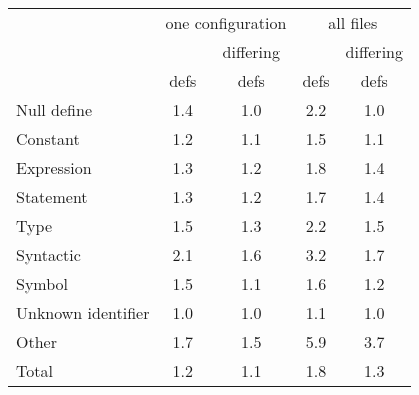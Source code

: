 \begin{tabular}{|l|c|c|c|c|} \hline
 & \multicolumn{2}{c|}{one configuration}
 & \multicolumn{2}{c|}{all files} \\ \cline{2-5}
 & & \multicolumn{1}{c|}{differing} & & \multicolumn{1}{c|}{differing} \\
 & \multicolumn{1}{c|}{defs} & \multicolumn{1}{c|}{defs}
 & \multicolumn{1}{c|}{defs} & \multicolumn{1}{c|}{defs} \\ \hline
Null define &    1.4 & 1.0 & 2.2 & 1.0 \\
Constant &       1.2 & 1.1 & 1.5 & 1.1 \\
Expression &     1.3 & 1.2 & 1.8 & 1.4 \\
Statement &      1.3 & 1.2 & 1.7 & 1.4 \\
Type &           1.5 & 1.3 & 2.2 & 1.5 \\
Syntactic &      2.1 & 1.6 & 3.2 & 1.7 \\
Symbol &         1.5 & 1.1 & 1.6 & 1.2 \\
Unknown identifier & 1.0 & 1.0 & 1.1 & 1.0 \\
Other &          1.7 & 1.5 & 5.9 & 3.7 \\ \hline
Total &          1.2 & 1.1 & 1.8 & 1.3 \\ \hline
\end{tabular}


